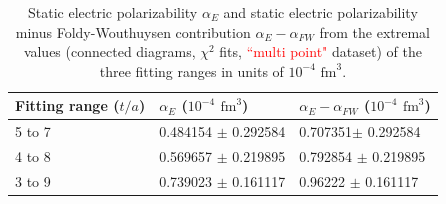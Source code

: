 \begin{table}[h!]
\begin{center}
    \begin{tabular}{ | p{2cm}  | p{4cm} | p{4cm} | }
    \hline
     Fitting range ($t/a$) & $\alpha_E$ ($10^{-4}$ $\text{fm}^3$)    & $\alpha_E-\alpha_{FW}$ ($10^{-4}$ $\text{fm}^3$)       \\ 
     \hline
     5 to 7 & 0.484154 $\pm$ 0.292584      &    0.707351$\pm$ 0.292584          \\ \hline
     4 to 8 &  0.569657 $\pm$ 0.219895       &  0.792854 $\pm$ 0.219895             \\ \hline
     3 to 9 &    0.739023 $\pm$ 0.161117       &  0.96222 $\pm$ 0.161117            \\ \hline
    \end{tabular}
\end{center}
\caption{Static electric polarizability  $\alpha_E$ and static electric polarizability minus Foldy-Wouthuysen contribution $\alpha_E-\alpha_{FW}$ from the extremal values (connected diagrams, $\chi^2$ fits, \textcolor{red}{``multi point"} dataset) of the three fitting ranges in units of $10^{-4}$ $\text{fm}^3$.}
\label{Tab:ConnectedPolarizabilities}
\end{table}

